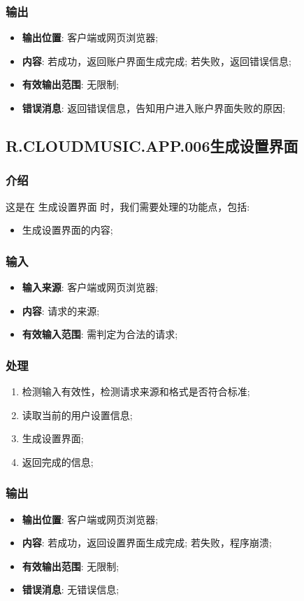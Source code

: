 \subsubsection{输出}
\begin{itemize}
	\item \textbf{输出位置}: 客户端或网页浏览器;
	\item \textbf{内容}: 若成功，返回账户界面生成完成; 若失败，返回错误信息;
	\item \textbf{有效输出范围}: 无限制;
	\item \textbf{错误消息}: 返回错误信息，告知用户进入账户界面失败的原因;
\end{itemize}
\subsection{R.CLOUDMUSIC.APP.006生成设置界面}
\subsubsection{介绍}
	这是在 生成设置界面 时，我们需要处理的功能点，包括: 
	\begin{itemize}
		\item 生成设置界面的内容;
	\end{itemize}
\subsubsection{输入}
	\begin{itemize}
		\item \textbf{输入来源}: 客户端或网页浏览器;
		\item \textbf{内容}: 请求的来源;
		\item \textbf{有效输入范围}: 需判定为合法的请求;
	\end{itemize}
\subsubsection{处理}
	\begin{enumerate}
		\item 检测输入有效性，检测请求来源和格式是否符合标准;
		\item 读取当前的用户设置信息;
		\item 生成设置界面;
		\item 返回完成的信息;
	\end{enumerate}
\subsubsection{输出}
\begin{itemize}
	\item \textbf{输出位置}: 客户端或网页浏览器;
	\item \textbf{内容}: 若成功，返回设置界面生成完成; 若失败，程序崩溃;
	\item \textbf{有效输出范围}: 无限制;
	\item \textbf{错误消息}: 无错误信息;
\end{itemize}
